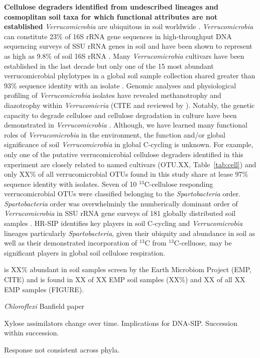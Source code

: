\textbf{Cellulose degraders identified from undescribed lineages and
cosmoplitan soil taxa for which functional attributes are not established}
\textit{Verrucomicrobia} are ubiquitous in soil worldwide
\citep{Bergmann_2011}.  \textit{Verrucomicrobia} can constitute 23\% of 16S
rRNA gene sequences in high-throughput DNA sequencing surveys of SSU rRNA genes
in soil \citep{Bergmann_2011} and have been shown to represent as high as 9.8\%
of soil 16S rRNA \citep{Buckley_2001}. Many \textit{Verrucomicrobia} cultivars
have been established in the last decade \cite{Wertz_2011} but only one of the
15 most abundant verrucomicrobial phylotypes in a global soil sample collection
shared greater than 93\% sequence identity with an isolate
\citep{Bergmann_2011}.  Genomic analyses and physiological profiling of
\textit{Verrucomicrobia} isolates have revealed methanotrophy and diazotrophy
\citep{Wertz_2011} within \textit{Verrucomicria} (CITE and reviewed by
\citet{Wertz_2011}). Notably, the genetic capacity to degrade cellulose and
cellulose degradation in culture have been demonstrated in
\textit{Verrucomicrobia} \citep{Otsuka_2012, Wertz_2011}.  Although, we have
learned many functional roles of \textit{Verrucomicrobia} in the environment,
the function and/or global significance of soil \textit{Verrucomicrobia} in
global C-cycling is unknown. For example, only one of the putative
verrucomicrobial cellulose degraders identified in this experiment are closely
related to named cultivars (OTU.XX, Table~\ref{tab:cell}) and only XX\% of all
verrucomicrobial OTUs found in this study share at lease 97\% sequence identity
with isolates. Seven of 10 $^{13}$C-cellulose responding verrucomicrobial OTUs were
classified belonging to the \textit{Spartobacteria} order.  \textit{Spartobacteria}
order was overwhelminly the numberically dominant order of \textit{Verrucomicrobia} in
SSU rRNA gene surveys of 181 globally distributed soil samples
\citep{Bergmann_2011}. HR-SIP identifies key players in soil C-cycling and
\textit{Verrucomicrobia} lineages particularly \textit{Spartobacteria}, given
their ubiquity and abundance in soil as well as their demonstrated
incorporation of $^{13}$C from $^{13}$C-celluose, may be significant players in
global soil cellulose respiration. 

is XX\% abundant in soil samples screen by the Earth Microbiom Project (EMP, CITE) and is
found in XX of XX EMP soil samples (XX\%) and XX of all XX EMP samples (FIGURE). 

\textit{Chloroflexi} Banfield paper

Xylose assimilators change over time. Implications for DNA-SIP. Succession within succession.

Response not consistent across phyla.

